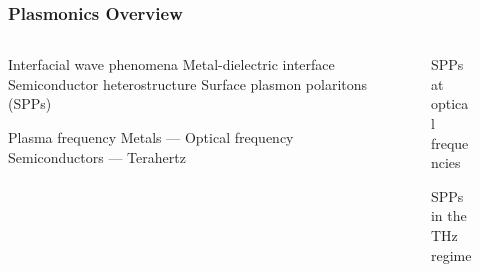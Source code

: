 \documentclass[10pt]{beamer}
\begin{document}
\begin{frame}
    \frametitle{Plasmonics Overview}
    \begin{columns} %
        \begin{column}{.5\textwidth}
            \begin{outline}[itemize]
                \1 Interfacial wave phenomena
                \2 Metal-dielectric interface
                \2 Semiconductor heterostructure
                \1 Surface plasmon polaritons (SPPs)
            \end{outline}
            \begin{outline}[itemize]
                \1 Plasma frequency
                \2 Metals — Optical frequency
                \2 Semiconductors — Terahertz
            \end{outline}
        \end{column}
        \begin{column}{.5\textwidth}
            \begin{figure}
                \centering
                \fontsize{6}{7}\selectfont%
                \def\svgwidth{.8\linewidth}
                
                \label{fig:spp}
                \caption{SPPs at optical frequencies}
            \end{figure}
            \begin{figure}
                \centering
                \fontsize{6}{7}\selectfont
                \def\svgwidth{.8\linewidth}
                
                \label{fig:spp_2deg}
                \caption{SPPs in the THz regime}
            \end{figure}
        \end{column}%
    \end{columns}
\end{frame}
\end{document}
